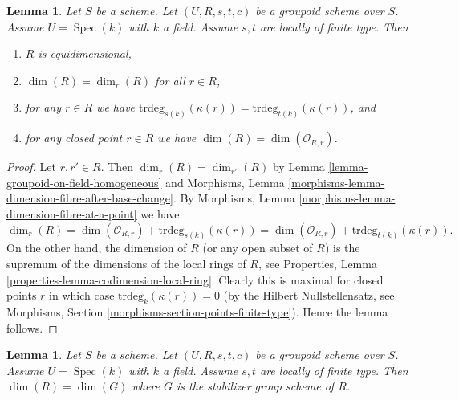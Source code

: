 \documentclass{stacks-project}
\theoremstyle{plain}
\newtheorem{lemma}[subsection]{Lemma}
\theoremstyle{definition}
\theoremstyle{remark}
\numberwithin{equation}{subsection}
\def\Spec{\mathop{\mathrm{Spec}}}
\begin{document}
\begin{lemma}
\label{lemma-groupoid-on-field-locally-finite-type-dimension}
Let $S$ be a scheme. Let $(U, R, s, t, c)$ be a groupoid scheme
over $S$. Assume $U = \Spec(k)$ with $k$ a field.
Assume $s, t$ are locally of finite type.
Then
\begin{enumerate}
\item $R$ is equidimensional,
\item $\dim(R) = \dim_r(R)$ for all $r \in R$,
\item for any $r \in R$ we have
$\text{trdeg}_{s(k)}(\kappa(r)) = \text{trdeg}_{t(k)}(\kappa(r))$, and
\item for any closed point $r \in R$ we have
$\dim(R) = \dim(\mathcal{O}_{R, r})$.
\end{enumerate}
\end{lemma}

\begin{proof}
Let $r, r' \in R$.
Then $\dim_r(R) = \dim_{r'}(R)$ by
Lemma \ref{lemma-groupoid-on-field-homogeneous}
and
Morphisms, Lemma \ref{morphisms-lemma-dimension-fibre-after-base-change}.
By
Morphisms, Lemma \ref{morphisms-lemma-dimension-fibre-at-a-point}
we have
$$
\dim_r(R) =
\dim(\mathcal{O}_{R, r}) + \text{trdeg}_{s(k)}(\kappa(r)) =
\dim(\mathcal{O}_{R, r}) + \text{trdeg}_{t(k)}(\kappa(r)).
$$
On the other hand, the dimension of $R$ (or any open subset of $R$)
is the supremum of the dimensions of the local rings of $R$, see
Properties, Lemma \ref{properties-lemma-codimension-local-ring}.
Clearly this is maximal for closed points $r$ in which case
$\text{trdeg}_k(\kappa(r)) = 0$ (by the Hilbert Nullstellensatz, see
Morphisms, Section \ref{morphisms-section-points-finite-type}).
Hence the lemma follows.
\end{proof}

\begin{lemma}
\label{lemma-groupoid-on-field-dimension-equal-stabilizer}
Let $S$ be a scheme. Let $(U, R, s, t, c)$ be a groupoid scheme
over $S$. Assume $U = \Spec(k)$ with $k$ a field.
Assume $s, t$ are locally of finite type.
Then $\dim(R) = \dim(G)$ where $G$ is the stabilizer group scheme of $R$.
\end{lemma}
\end{document}
